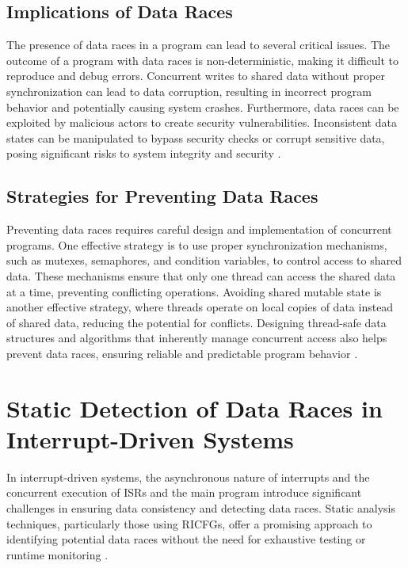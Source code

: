 \documentclass[
fancyheadings, %
%
%
]{stsreprt}
\begin{document}
{\subsection{Implications of Data Races}

The presence of data races in a program can lead to several critical issues. The outcome of a program with data races is non-deterministic, making it difficult to reproduce and debug errors. Concurrent writes to shared data without proper synchronization can lead to data corruption, resulting in incorrect program behavior and potentially causing system crashes. Furthermore, data races can be exploited by malicious actors to create security vulnerabilities. Inconsistent data states can be manipulated to bypass security checks or corrupt sensitive data, posing significant risks to system integrity and security \cite{adve1996}.

\subsection{Strategies for Preventing Data Races}

Preventing data races requires careful design and implementation of concurrent programs. One effective strategy is to use proper synchronization mechanisms, such as mutexes, semaphores, and condition variables, to control access to shared data. These mechanisms ensure that only one thread can access the shared data at a time, preventing conflicting operations. Avoiding shared mutable state is another effective strategy, where threads operate on local copies of data instead of shared data, reducing the potential for conflicts. Designing thread-safe data structures and algorithms that inherently manage concurrent access also helps prevent data races, ensuring reliable and predictable program behavior \cite{herlihy2008}.

\section{Static Detection of Data Races in Interrupt-Driven Systems}

In interrupt-driven systems, the asynchronous nature of interrupts and the concurrent execution of ISRs and the main program introduce significant challenges in ensuring data consistency and detecting data races. Static analysis techniques, particularly those using RICFGs, offer a promising approach to identifying potential data races without the need for exhaustive testing or runtime monitoring \cite{wang2020}.

}
\end{document}
